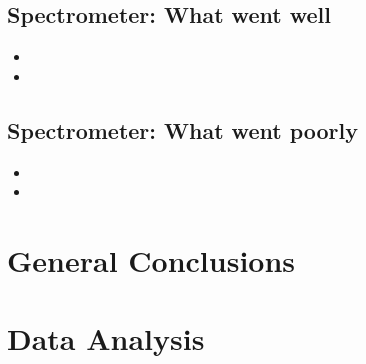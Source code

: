 \subsection{Spectrometer: {\color{blue}What went well}}

\begin{itemize}
\item{}
\item{}
\end{itemize}

\subsection{Spectrometer: {\color{red} What went poorly}}

\begin{itemize}
\item{}
\item{}
\end{itemize}


\section{General Conclusions}


\newpage

\section{Data Analysis}

